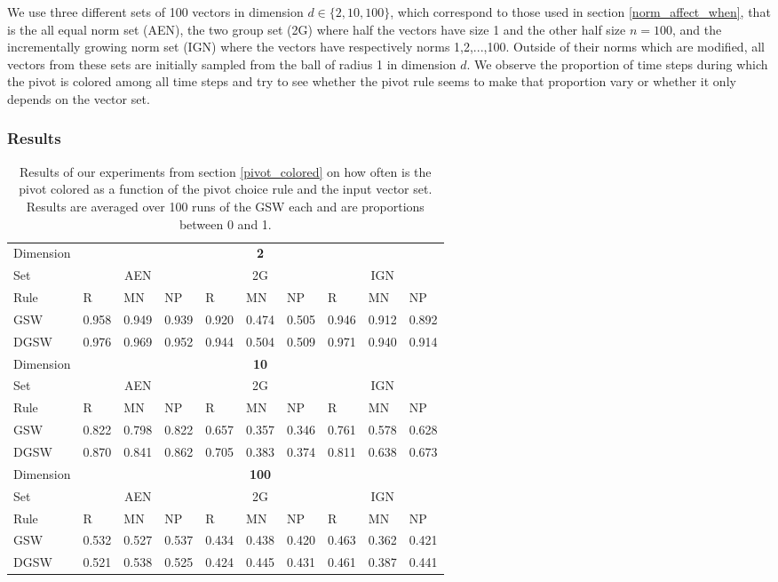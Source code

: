 \documentclass[12pt]{article}
\begin{document}
We use three different sets of 100 vectors in dimension $d\in\{2,10,100\}$, which correspond to those used in section \ref{norm_affect_when}, that is the all equal norm set (AEN), the two group set (2G) where half the vectors have size 1 and the other half size $n=100$, and the incrementally growing norm set (IGN) where the vectors have respectively norms 1,2,...,100. Outside of their norms which are modified, all vectors from these sets are initially sampled from the ball of radius 1 in dimension $d$. We observe the proportion of time steps during which the pivot is colored among all time steps and try to see whether the pivot rule seems to make that proportion vary or whether it only depends on the vector set.

\subsubsection{Results}
\begin{table}[h!]
\centering
\caption{Results of our experiments from section \ref{pivot_colored} on how often is the pivot colored as a function of the pivot choice rule and the input vector set. Results are averaged over 100 runs of the GSW each and are proportions between 0 and 1.}
\begin{tabular}{l|lll|lll|lll}
Dimension &\multicolumn{9}{c}{\textbf{2}}\\
Set  & \multicolumn{3}{c}{AEN} & \multicolumn{3}{c}{2G} & \multicolumn{3}{c}{IGN} \\
Rule &R&MN&NP&R&MN&NP&R&MN&NP\\ \hline
GSW  &0.958&0.949&0.939&0.920&0.474&0.505&0.946&0.912&0.892\\
DGSW  &0.976&0.969&0.952&0.944&0.504&0.509&0.971&0.940&0.914\\
\hline
\hline
Dimension &\multicolumn{9}{c}{\textbf{10}}\\
Set  & \multicolumn{3}{c}{AEN} & \multicolumn{3}{c}{2G} & \multicolumn{3}{c}{IGN} \\
Rule &R&MN&NP&R&MN&NP&R&MN&NP\\ \hline
GSW  &0.822&0.798&0.822&0.657&0.357&0.346&0.761&0.578&0.628 \\
DGSW  &0.870&0.841&0.862&0.705&0.383&0.374&0.811&0.638&0.673\\
\hline
\hline
Dimension &\multicolumn{9}{c}{\textbf{100}}\\
Set  & \multicolumn{3}{c}{AEN} & \multicolumn{3}{c}{2G} & \multicolumn{3}{c}{IGN} \\
Rule &R&MN&NP&R&MN&NP&R&MN&NP\\ \hline
GSW  &0.532&0.527&0.537&0.434&0.438&0.420&0.463&0.362&0.421 \\
DGSW  &0.521&0.538&0.525&0.424&0.445&0.431&0.461&0.387&0.441\\
\end{tabular}
\label{pivot_colored_results}
\end{table}
\end{document}

